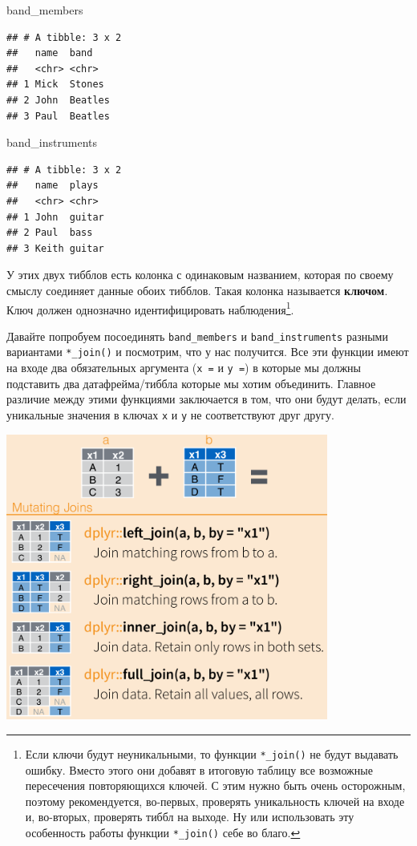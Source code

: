 \documentclass[
]{book}
\newenvironment{Shaded}{\begin{snugshade}}{\end{snugshade}}
\newcommand{\NormalTok}[1]{#1}
\begin{document}
\begin{Shaded}
\begin{Highlighting}[]
\NormalTok{band_members}
\end{Highlighting}
\end{Shaded}

\begin{verbatim}
## # A tibble: 3 x 2
##   name  band   
##   <chr> <chr>  
## 1 Mick  Stones 
## 2 John  Beatles
## 3 Paul  Beatles
\end{verbatim}

\begin{Shaded}
\begin{Highlighting}[]
\NormalTok{band_instruments}
\end{Highlighting}
\end{Shaded}

\begin{verbatim}
## # A tibble: 3 x 2
##   name  plays 
##   <chr> <chr> 
## 1 John  guitar
## 2 Paul  bass  
## 3 Keith guitar
\end{verbatim}

У этих двух тибблов есть колонка с одинаковым названием, которая по своему смыслу соединяет данные обоих тибблов. Такая колонка называется \textbf{ключом}. Ключ должен однозначно идентифицировать наблюдения\footnote{Если ключи будут неуникальными, то функции \texttt{*\_join()} не будут выдавать ошибку. Вместо этого они добавят в итоговую таблицу все возможные пересечения повторяющихся ключей. С этим нужно быть очень осторожным, поэтому рекомендуется, во-первых, проверять уникальность ключей на входе и, во-вторых, проверять тиббл на выходе. Ну или использовать эту особенность работы функции \texttt{*\_join()} себе во благо.}.

Давайте попробуем посоединять \texttt{band\_members} и \texttt{band\_instruments} разными вариантами \texttt{*\_join()} и посмотрим, что у нас получится. Все эти функции имеют на входе два обязательных аргумента (\texttt{x\ =} и \texttt{y\ =}) в которые мы должны подставить два датафрейма/тиббла которые мы хотим объединить. Главное различие между этими функциями заключается в том, что они будут делать, если уникальные значения в ключах \texttt{x} и \texttt{y} не соответствуют друг другу.

\includegraphics[width=4.16667in,height=\textheight]{images/joins.png}
\end{document}
